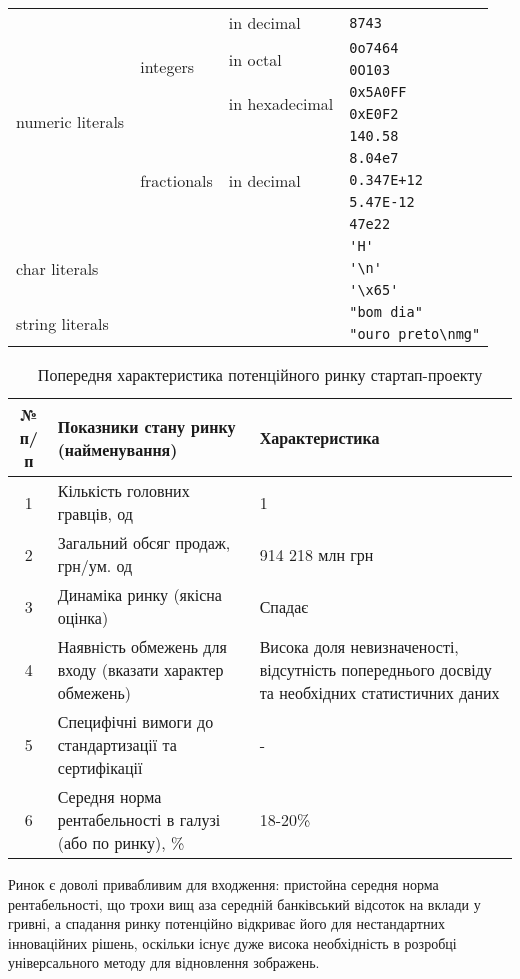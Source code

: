 \begin{tabular}{|l|l|l|l|}\hline
  \multirow{10}{*}{numeric literals} & \multirow{5}{*}{integers} & in decimal & \verb|8743| \\ \cline{3-4}
  & & \multirow{2}{*}{in octal} & \verb|0o7464| \\ \cline{4-4}
  & & & \verb|0O103| \\ \cline{3-4}
  & & \multirow{2}{*}{in hexadecimal} & \verb|0x5A0FF| \\ \cline{4-4}
  & & & \verb|0xE0F2| \\ \cline{2-4}
  & \multirow{5}{*}{fractionals} & \multirow{5}{*}{in decimal} & \verb|140.58| \\ \cline{4-4}
  & & & \verb|8.04e7| \\ \cline{4-4}
  & & & \verb|0.347E+12| \\ \cline{4-4}
  & & & \verb|5.47E-12| \\ \cline{4-4}
  & & & \verb|47e22| \\ \cline{1-4}
  \multicolumn{3}{|l|}{\multirow{3}{*}{char literals}} & \verb|'H'| \\ \cline{4-4}
  \multicolumn{3}{|l|}{} & \verb|'\n'| \\ \cline{4-4}          %
  \multicolumn{3}{|l|}{} & \verb|'\x65'| \\ \cline{1-4}        %
  \multicolumn{3}{|l|}{\multirow{2}{*}{string literals}} & \verb|"bom dia"| \\ \cline{4-4}
  \multicolumn{3}{|l|}{} & \verb|"ouro preto\nmg"| \\ \cline{1-4}          %
\end{tabular}

\begin{table}
	\begin{tabularx}{\textwidth}{|c|X|X|}
    \hline
    № п/п & Показники стану ринку (найменування) & Характеристика \\ \hline
    1 & Кількість головних гравців, од & 1 \\ \hline
    2 & Загальний обсяг продаж, грн/ум. од & 914 218 млн грн \\ \hline
    3 & Динаміка ринку (якісна оцінка) & Спадає \\ \hline
    4 & Наявність обмежень для входу (вказати характер обмежень) & Висока доля невизначеності, відсутність попереднього досвіду та необхідних статистичних даних \\ \hline
    5 & Специфічні вимоги до стандартизації та сертифікації & - \\ \hline
    6 & Середня норма рентабельності в галузі (або по ринку), \% & 18-20\% \\
    \hline
    \end{tabularx}
\caption{Попередня характеристика потенційного ринку стартап-проекту} \label{tab:sometab}
\end{table}
Ринок є доволі привабливим для входження: пристойна середня норма рентабельності, що трохи вищ аза середній банківський відсоток на вклади у гривні, а спадання ринку потенційно відкриває його для нестандартних інноваційних рішень, оскільки існує дуже висока необхідність в розробці універсального методу для відновлення зображень.

